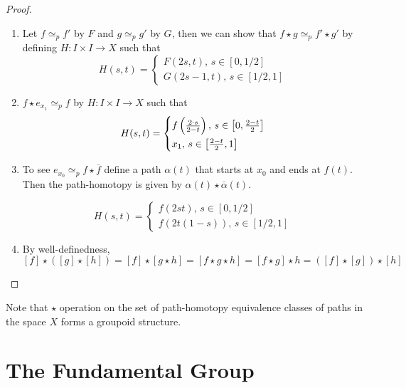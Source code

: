 \documentclass[12pt]{amsart}
\begin{document}
\begin{proof}
    \bbni
    \begin{enumerate}
        \item Let $f \simeq_p f'$ by $F$ and $g \simeq_p g'$ by $G$, then we can show that $f \star g \simeq_p f' \star g'$ by defining $H: I \times I \to X$ such that 
        \[H(s,t) = \begin{cases*}
            F(2s, t), \, s \in [0, 1/2] \\ 
            G(2s -1, t), \, s \in [1/2, 1]
        \end{cases*}\]

        \item $f \star e_{x_1} \simeq_p f$ by $H : I \times I \to X$ such that 
        \[H(s,t) = \begin{cases*}
            f \fr{2 \cdot s}{2-t}, \, s \in \left [0, \frac{2-t}{2} \right ] \\ 
            x_1, \, s \in \left [\frac{2-t}{2},1 \right ] \\ 
        \end{cases*}\]

        \item To see $e_{x_0} \simeq_p f \star \overline f$
        define a path $\alpha(t)$ that starts at $x_0$ and ends at $f(t)$. Then the path-homotopy is given by $\alpha(t) \star \overline{\alpha}(t)$. 

        \[H(s,t) = \begin{cases*}
            f(2st), \, s \in [0, 1/2] \\ 
            f(2t(1-s)), \, s \in [1/2, 1]
        \end{cases*}\]

        \item By well-definedness, 
        \[[f] \star ([g]\star[h]) = [f] \star [g \star h] = [f \star g \star h] = [f \star g] \star h = ([f]\star [g]) \star [h]\]
    \end{enumerate}
\end{proof}

\begin{remark}
    Note that $\star$ operation on the set of path-homotopy equivalence classes of paths in the space $X$ forms a groupoid structure.
\end{remark}

\newpage

\section{The Fundamental Group}
\end{document}
